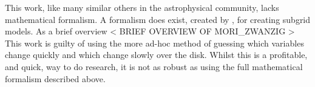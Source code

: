 This work, like many similar others in the astrophysical community, lacks mathematical formalism.
A formalism does exist, created by \citet{moriz_zwanzig}, for creating subgrid models.
As a brief overview
< BRIEF OVERVIEW OF MORI_ZWANZIG >
This work is guilty of using the more ad-hoc method of guessing which variables change quickly and which change slowly over the disk.
Whilst this is a profitable, and quick, way to do research, it is not as robust as using the full mathematical formalism described above.
